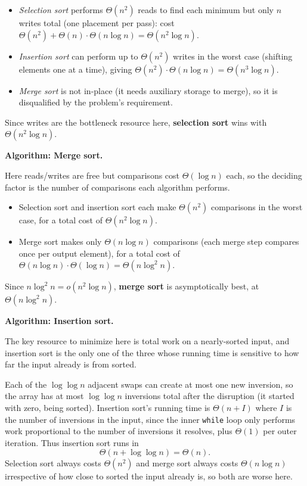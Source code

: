 \documentclass[12pt,twoside]{article}
\begin{document}
\begin{problems}
\begin{problemparts}
\begin{itemize}
  \item \emph{Selection sort} performs $\Theta(n^2)$ reads to find each minimum but only $n$
        writes total (one placement per pass): cost $\Theta(n^2) + \Theta(n)\cdot\Theta(n\log n)
        = \Theta(n^2\log n)$.
  \item \emph{Insertion sort} can perform up to $\Theta(n^2)$ writes in the worst case (shifting
        elements one at a time), giving $\Theta(n^2)\cdot\Theta(n\log n) = \Theta(n^3\log n)$.
  \item \emph{Merge sort} is not in-place (it needs auxiliary storage to merge), so it is
        disqualified by the problem's requirement.
\end{itemize}

Since writes are the bottleneck resource here, \textbf{selection sort} wins with
$\Theta(n^2\log n)$.

\problempart

\textbf{Algorithm: Merge sort.}

Here reads/writes are free but comparisons cost $\Theta(\log n)$ each, so the deciding factor is
the number of comparisons each algorithm performs.

\begin{itemize}
  \item Selection sort and insertion sort each make $\Theta(n^2)$ comparisons in the worst case,
        for a total cost of $\Theta(n^2\log n)$.
  \item Merge sort makes only $\Theta(n\log n)$ comparisons (each merge step compares once per
        output element), for a total cost of $\Theta(n\log n)\cdot\Theta(\log n) = \Theta(n\log^2 n)$.
\end{itemize}

Since $n\log^2 n = o(n^2\log n)$, \textbf{merge sort} is asymptotically best, at
$\Theta(n\log^2 n)$.

\problempart

\textbf{Algorithm: Insertion sort.}

The key resource to minimize here is total work on a nearly-sorted input, and insertion sort is
the only one of the three whose running time is sensitive to how far the input already is from
sorted.

Each of the $\log\log n$ adjacent swaps can create at most one new inversion, so the array has at
most $\log \log n$ inversions total after the disruption (it started with zero, being sorted).
Insertion sort's running time is $\Theta(n + I)$ where $I$ is the number of inversions in the
input, since the inner \texttt{while} loop only performs work proportional to the number of
inversions it resolves, plus $\Theta(1)$ per outer iteration. Thus insertion sort runs in
\[
  \Theta(n + \log\log n) = \Theta(n).
\]
Selection sort always costs $\Theta(n^2)$ and merge sort always costs $\Theta(n\log n)$
irrespective of how close to sorted the input already is, so both are worse here.


\end{problemparts}
\end{problems}
\end{document}
